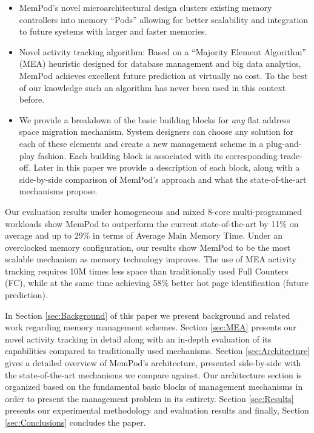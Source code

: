 \begin{itemize}
\item MemPod's novel microarchitectural design clusters existing memory controllers into memory ``Pods'' allowing for better scalability and integration to future systems with larger and faster memories.
\item Novel activity tracking algorithm: Based on a ``Majority Element Algorithm'' (MEA) heuristic designed for database management and big data analytics, MemPod achieves excellent future prediction at virtually no cost. To the best of our knowledge such an algorithm has never been used in this context before.
\item We provide a breakdown of the basic building blocks for \emph{any} flat address space migration mechanism. System designers can choose any solution for each of these elements and create a new management scheme in a plug-and-play fashion. Each building block is associated with its corresponding trade-off. Later in this paper we provide a description of each block, along with a side-by-side comparison of MemPod's approach and what the state-of-the-art mechanisms propose.
\end{itemize}

Our evaluation results under homogeneous and mixed 8-core multi-programmed workloads show MemPod to outperform the current state-of-the-art by 11\% on average and up to 29\% in terms of Average Main Memory Time. Under an overclocked memory configuration, our results show MemPod to be the most scalable mechanism as memory technology improves. The use of MEA activity tracking requires 10M times less space than traditionally used Full Counters (FC), while at the same time achieving 58\% better hot page identification (future prediction).

In Section \ref{sec:Background} of this paper we present background and related work regarding memory management schemes. Section \ref{sec:MEA} presents our novel activity tracking in detail along with an in-depth evaluation of its capabilities compared to traditionally used mechanisms. Section \ref{sec:Architecture} gives a detailed overview of MemPod's architecture, presented side-by-side with the state-of-the-art mechanisms we compare against. Our architecture section is organized based on the fundamental basic blocks of management mechanisms in order to present the management problem in its entirety. Section \ref{sec:Results} presents our experimental methodology and evaluation results and finally, Section \ref{sec:Conclusions} concludes the paper.